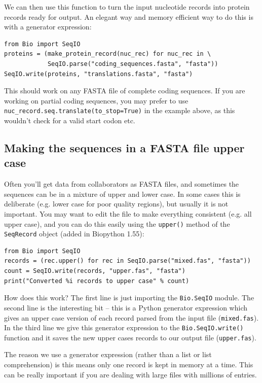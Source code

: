 \documentclass{report}
\begin{document}
We can then use this function to turn the input nucleotide records into protein
records ready for output.  An elegant way and memory efficient way to do this
is with a generator expression:

\begin{verbatim}
from Bio import SeqIO
proteins = (make_protein_record(nuc_rec) for nuc_rec in \
            SeqIO.parse("coding_sequences.fasta", "fasta"))
SeqIO.write(proteins, "translations.fasta", "fasta")
\end{verbatim}

This should work on any FASTA file of complete coding sequences.
If you are working on partial coding sequences, you may prefer to use
\verb|nuc_record.seq.translate(to_stop=True)| in the example above, as
this wouldn't check for a valid start codon etc.

\subsection{Making the sequences in a FASTA file upper case}

Often you'll get data from collaborators as FASTA files, and sometimes the
sequences can be in a mixture of upper and lower case. In some cases this is
deliberate (e.g. lower case for poor quality regions), but usually it is not
important. You may want to edit the file to make everything consistent (e.g.
all upper case), and you can do this easily using the \verb|upper()| method
of the \verb|SeqRecord| object (added in Biopython 1.55):

\begin{verbatim}
from Bio import SeqIO
records = (rec.upper() for rec in SeqIO.parse("mixed.fas", "fasta"))
count = SeqIO.write(records, "upper.fas", "fasta")
print("Converted %i records to upper case" % count)
\end{verbatim}

How does this work? The first line is just importing the \verb|Bio.SeqIO|
module. The second line is the interesting bit -- this is a Python
generator expression which gives an upper case version of each record
parsed from the input file (\texttt{mixed.fas}). In the third line we give
this generator expression to the \verb|Bio.SeqIO.write()| function and it
saves the new upper cases records to our output file (\texttt{upper.fas}).

The reason we use a generator expression (rather than a list or list
comprehension) is this means only one record is kept in memory at a time.
This can be really important if you are dealing with large files with
millions of entries.
\end{document}
